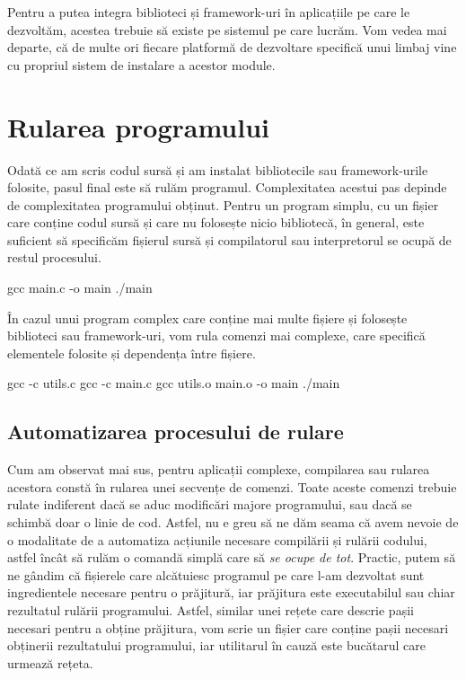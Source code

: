Pentru a putea integra biblioteci și framework-uri în aplicațiile pe care le
dezvoltăm, acestea trebuie să existe pe sistemul pe care lucrăm. Vom vedea mai
departe, că de multe ori fiecare platformă de dezvoltare specifică unui limbaj
vine cu propriul sistem de instalare a acestor module.

\section{Rularea programului}
\label{sec:appdev-run}

Odată ce am scris codul sursă și am instalat bibliotecile sau framework-urile
folosite, pasul final este să rulăm programul. Complexitatea acestui pas depinde
de complexitatea programului obținut. Pentru un program simplu, cu un fișier
care conține codul sursă și care nu folosește nicio bibliotecă, în general, este
suficient să specificăm fișierul sursă și compilatorul sau interpretorul se
ocupă de restul procesului.


\begin{screen}
gcc main.c -o main
./main
\end{screen}

În cazul unui program complex care conține mai multe fișiere și folosește
biblioteci sau framework-uri, vom rula comenzi mai complexe, care specifică
elementele folosite și dependența între fișiere.


\begin{screen}
gcc -c utils.c
gcc -c main.c
gcc utils.o main.o -o main
./main
\end{screen}

\subsection{Automatizarea procesului de rulare}
\label{sec:appdev-automation}

Cum am observat mai sus, pentru aplicații complexe, compilarea sau rularea
acestora constă în rularea unei secvențe de comenzi. Toate aceste comenzi
trebuie rulate indiferent dacă se aduc modificări majore programului, sau dacă
se schimbă doar o linie de cod. Astfel, nu e greu să ne dăm seama că avem nevoie
de o modalitate de a automatiza acțiunile necesare compilării și rulării
codului, astfel încât să rulăm o comandă simplă care să \textit{se ocupe de
tot}. Practic, putem să ne gândim că fișierele care alcătuiesc programul pe
care l-am dezvoltat sunt ingredientele necesare pentru o prăjitură, iar
prăjitura este executabilul sau chiar rezultatul rulării programului. Astfel,
similar unei rețete care descrie pașii necesari pentru a obține prăjitura, vom
scrie un fișier care conține pașii necesari obținerii rezultatului programului,
iar utilitarul în cauză este bucătarul care urmează rețeta.

